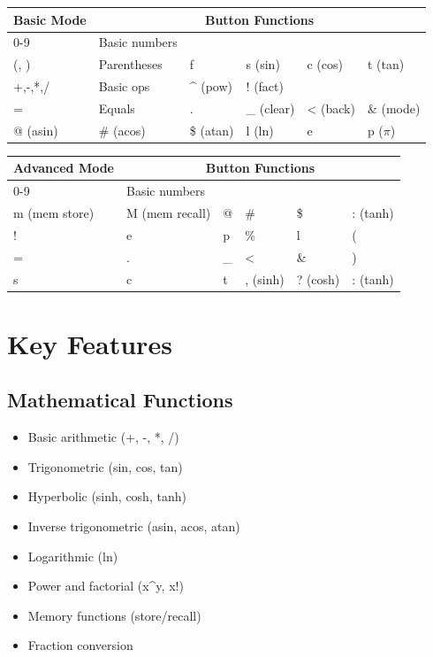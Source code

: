 \documentclass{article}
\begin{document}
\begin{table}[h]
\centering
\begin{tabular}{|l|l|l|l|l|l|}
\hline
\textbf{Basic Mode} & \multicolumn{5}{c|}{\textbf{Button Functions}} \\
\hline
0-9 & Basic numbers &  &  &  &  \\
\hline
(, ) & Parentheses & f & s (sin) & c (cos) & t (tan) \\
\hline
+,-,*,/ & Basic ops & \^{} (pow) & ! (fact) &  &  \\
\hline
= & Equals & . & \_ (clear) & < (back) & \& (mode) \\
\hline
@ (asin) & \# (acos) & \$ (atan) & l (ln) & e & p ($\pi$) \\
\hline
\end{tabular}
\end{table}

\begin{table}[h]
\centering
\begin{tabular}{|l|l|l|l|l|l|}
\hline
\textbf{Advanced Mode} & \multicolumn{5}{c|}{\textbf{Button Functions}} \\
\hline
0-9 & Basic numbers &  &  &  &  \\
\hline
m (mem store) & M (mem recall) & @ & \# & \$ & : (tanh) \\
\hline
! & e & p & \% & l & ( \\
\hline
= & . & \_ & < & \& & ) \\
\hline
s & c & t & , (sinh) & ? (cosh) & : (tanh) \\
\hline
\end{tabular}
\end{table}

\section{Key Features}

\subsection{Mathematical Functions}
\begin{itemize}
    \item Basic arithmetic (+, -, *, /)
    \item Trigonometric (sin, cos, tan)
    \item Hyperbolic (sinh, cosh, tanh)
    \item Inverse trigonometric (asin, acos, atan)
    \item Logarithmic (ln)
    \item Power and factorial (x\^{}y, x!)
    \item Memory functions (store/recall)
    \item Fraction conversion
\end{itemize}
\end{document}

